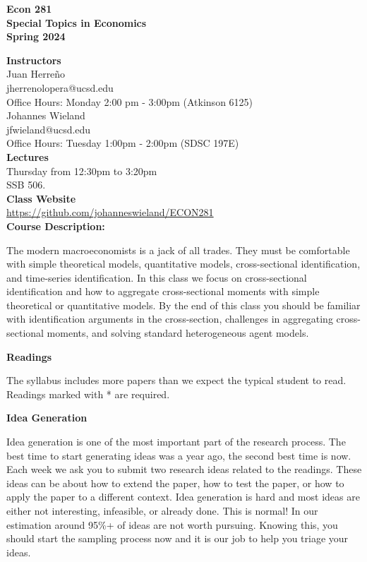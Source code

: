 \documentclass [12pt]{article}
\begin{document}
\begin{center}
\textbf{Econ 281\\
Special Topics in Economics\\
Spring 2024}
\end{center}


\noindent \textbf{Instructors} \\
Juan Herre\~no\\ 
jherrenolopera@ucsd.edu\\
Office Hours: Monday 2:00 pm - 3:00pm (Atkinson 6125)\\

\noindent Johannes Wieland\\ 
jfwieland@ucsd.edu\\
Office Hours: Tuesday 1:00pm - 2:00pm  (SDSC 197E)\\


\noindent \textbf{Lectures} \\
Thursday from 12:30pm to 3:20pm \\
SSB 506.\\

\noindent \textbf{Class Website} \\
\href{https://github.com/johanneswieland/ECON281}{https://github.com/johanneswieland/ECON281} \\


\noindent \textbf{Course Description:} 

The modern macroeconomists is a jack of all trades. They must be comfortable with simple theoretical models, quantitative models, cross-sectional identification, and time-series identification. In this class we focus on cross-sectional identification and how to aggregate cross-sectional moments with simple theoretical or quantitative models. By the end of this class you should be familiar with identification arguments in the cross-section, challenges in aggregating cross-sectional moments, and solving standard heterogeneous agent models.



\noindent  \textbf{Readings}



\noindent The syllabus includes more papers than we expect the typical student to read. Readings marked with * are required.


\noindent  \textbf{Idea Generation}

Idea generation is one of the most important part of the research process. The best time to start generating ideas was a year ago, the second best time is now. Each week we ask you to submit two research ideas related to the readings. These ideas can be about how to extend the paper, how to test the paper, or how to apply the paper to a different context. Idea generation is hard and most ideas are either not interesting, infeasible, or already done. This is normal! In our estimation around 95\%+ of ideas are not worth pursuing. Knowing this, you should start the sampling process now and it is our job to help you triage your ideas.
\end{document}
